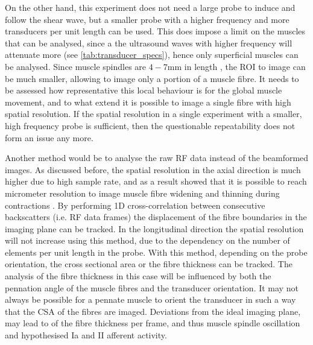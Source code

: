 On the other hand, this experiment does not need a large probe to induce and follow the shear wave, but a smaller probe with a higher frequency and more transducers per unit length can be used. This does impose a limit on the muscles that can be analysed, since a the ultrasound waves with higher frequency will attenuate more (see \autoref{tab:transducer_specs}), hence only superficial muscles can be analysed.  
Since muscle spindles are $4-7$\si{\milli\meter} in length \cite{smith_chapter_2007}, the ROI to image can be much smaller, allowing to image only a portion of a muscle fibre. It needs to be assessed how representative this local behaviour is for the global muscle movement, and to what extend it is possible to image a single fibre with high spatial resolution. If the spatial resolution in a single experiment with a smaller, high frequency probe is sufficient, then the questionable repeatability does not form an issue any more. 

Another method would be to analyse the raw RF data instead of the beamformed images. As discussed before, the spatial resolution in the axial direction is much higher due to high sample rate, and as a result \citeauthor{deffieux_assessment_2008} showed that it is possible to reach micrometer resolution to image muscle fibre widening and thinning during contractions \cite{deffieux_assessment_2008}. By performing 1D cross-correlation between consecutive backscatters (i.e. RF data frames) the displacement of the fibre boundaries in the imaging plane can be tracked. In the longitudinal direction the spatial resolution will not increase using this method, due to the dependency on the number of elements per unit length in the probe. With this method, depending on the probe orientation, the cross sectional area or the fibre thickness can be tracked. The analysis of the fibre thickness in this case will be influenced by both the pennation angle of the muscle fibres and the transducer orientation. It may not always be possible for a pennate muscle to orient the transducer in such a way that the CSA of the fibres are imaged. Deviations from the ideal imaging plane, may lead to  of the fibre thickness per frame, and thus muscle spindle oscillation and hypothesised Ia and II afferent activity. 

